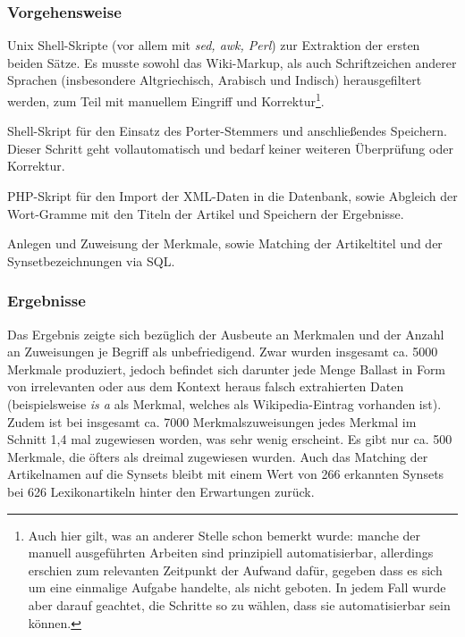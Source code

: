 \documentclass[pagesize,DIV=calc,12pt,final]{scrreprt}
\begin{document}
\subsubsection{Vorgehensweise}

\begin{inparaenum}
\item Unix Shell-Skripte (vor allem mit \emph{sed, awk, Perl}) zur Extraktion der ersten beiden Sätze. 
    Es musste sowohl das Wiki-Markup, als auch Schriftzeichen anderer Sprachen (insbesondere Altgriechisch, Arabisch und Indisch) herausgefiltert werden, zum Teil mit manuellem Eingriff und Korrektur\footnote{Auch hier gilt, was an anderer Stelle schon bemerkt wurde: manche der manuell ausgeführten Arbeiten sind prinzipiell automatisierbar, allerdings erschien zum relevanten Zeitpunkt der Aufwand dafür, gegeben dass es sich um eine einmalige Aufgabe handelte, als nicht geboten. 
In jedem Fall wurde aber darauf geachtet, die Schritte so zu wählen, dass sie automatisierbar sein können.}.

\item Shell-Skript für den Einsatz des Porter-Stemmers und anschließendes Speichern. 
Dieser Schritt geht vollautomatisch und bedarf keiner weiteren Überprüfung oder Korrektur.

\item PHP-Skript für den Import der XML-Daten in die Datenbank, sowie Abgleich der Wort-Gramme mit den Titeln der Artikel und Speichern der Ergebnisse.

\item Anlegen und Zuweisung der Merkmale, sowie Matching der Artikeltitel und der Synsetbezeichnungen via SQL. 
\end{inparaenum}

\subsubsection{Ergebnisse}

Das Ergebnis zeigte sich bezüglich der Ausbeute an Merkmalen und der Anzahl an Zuweisungen je Begriff als unbefriedigend. 
Zwar wurden insgesamt ca. 5000 Merkmale produziert, jedoch befindet sich darunter jede Menge Ballast in Form von irrelevanten oder aus dem Kontext heraus falsch extrahierten Daten (beispielsweise \emph{is a} als Merkmal, welches als Wikipedia-Eintrag vorhanden ist). 
Zudem ist bei insgesamt ca. 7000 Merkmalszuweisungen jedes Merkmal im Schnitt 1,4 mal zugewiesen worden, was sehr wenig erscheint. 
Es gibt nur ca. 500 Merkmale, die öfters als dreimal zugewiesen wurden. 
Auch das Matching der Artikelnamen auf die Synsets bleibt mit einem Wert von 266 erkannten Synsets bei 626 Lexikonartikeln hinter den Erwartungen zurück. 
\end{document}
